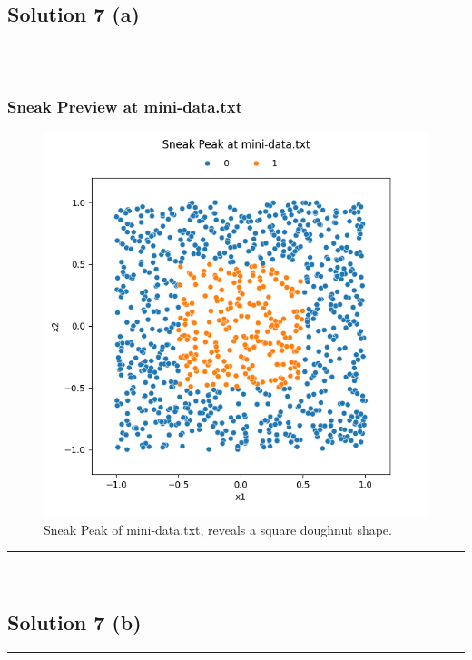 \documentclass{article}
\begin{document}
\newpage


\subsection*{Solution 7 (a)}
\noindent\rule{\textwidth}{0.4pt}\\

\subsubsection*{Sneak Preview at mini-data.txt}

\begin{figure}[H]
  \includegraphics{hw9_q7a.png}
  \caption{Sneak Peak of mini-data.txt, reveals a square doughnut shape.}
\end{figure}

\noindent\rule{\textwidth}{0.4pt}\\

\newpage

\subsection*{Solution 7 (b)}
\noindent\rule{\textwidth}{0.4pt}\\
\end{document}
